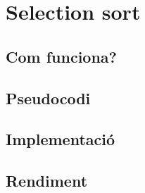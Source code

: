 \chapter{Selection sort}

\section{Com funciona?}
\section{Pseudocodi}
\section{Implementació}

\section{Rendiment}
